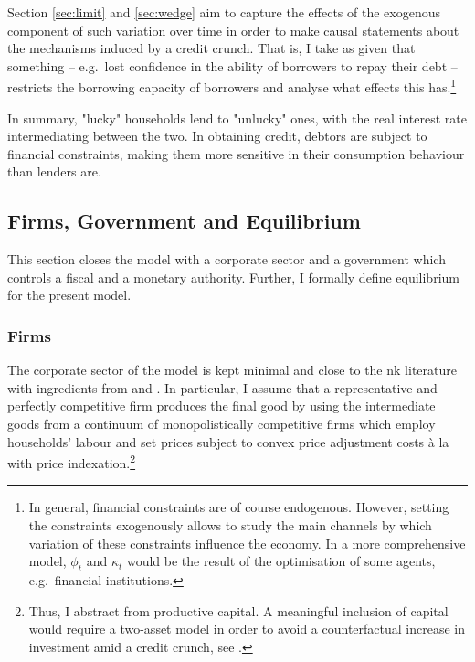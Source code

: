 \documentclass[a4paper,12pt]{article} %
\numberwithin{equation}{section} %
\numberwithin{figure}{section}
\numberwithin{table}{section}
\begin{document}
Section \ref{sec:limit} and \ref{sec:wedge} aim to capture the effects of the exogenous component of such variation over time in order to make causal statements about the mechanisms induced by a credit crunch. That is, I take as given that something -- e.g.~lost confidence in the ability of borrowers to repay their debt -- restricts the borrowing capacity of borrowers and analyse what effects this has.\footnote{In general, financial constraints are of course endogenous. However, setting the constraints exogenously allows to study the main channels by which variation of these constraints influence the economy. In a more comprehensive model, $\phi_t$ and $\kappa_t$ would be the result of the optimisation of some agents, e.g.~financial institutions.}

In summary, "lucky" households lend to "unlucky" ones, with the real interest rate intermediating between the two. In obtaining credit, debtors are subject to financial constraints, making them more sensitive in their consumption behaviour than lenders are.

\subsection{Firms, Government and Equilibrium}
\label{sec:model-sectors}

This section closes the model with a corporate sector and a government which controls a fiscal and a monetary authority. Further, I formally define equilibrium for the present model.

\subsubsection{Firms}
\label{sec:model-firms}

The corporate sector of the model is kept minimal and close to the \Gls{nk} literature with ingredients from \textcite{mckay2016} and \textcite{gust2017wp}. In particular, I assume that a representative and perfectly competitive firm produces the final good by using the intermediate goods from a continuum of monopolistically competitive firms which employ households' labour and set prices subject to convex price adjustment costs à la \textcite{rotemberg1982} with price indexation.\footnote{Thus, I abstract from productive capital. A meaningful inclusion of capital would require a two-asset model in order to avoid a counterfactual increase in investment amid a credit crunch, see \textcite{kv2018}.}
\end{document}
